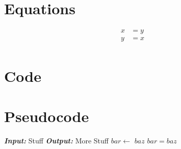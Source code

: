 \documentclass[11pt]{article}
\begin{document}
\section{Equations}

\begin{align*}
  x &= y \\
  y &= x \\
\end{align*}

\newpage

\section{Code}

% 

\section{Pseudocode}

\begin{algorithm}
\begin{algorithmic}[1]
    \State \textbf{\textit{Input:}} Stuff
    \State \textbf{\textit{Output:}} More Stuff
      \State $bar \gets$ $baz$
      \State $bar = baz$
    \EndWhile
  \EndProcedure
\end{algorithmic}
\end{algorithm}
\end{document}
